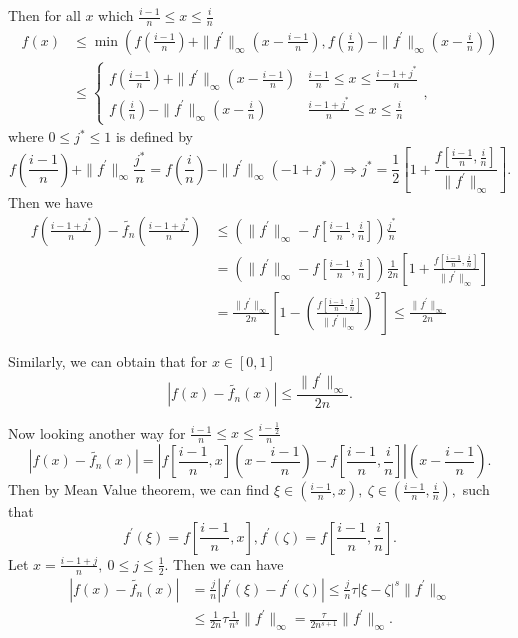   Then for all $x$ which $\frac{i-1}{n} \leq x \leq \frac{i}{n}$
  \begin{align*}
  f(x) & \leq \min\left(f\left(\frac{i-1}{n}\right)+\|f^{'}\|_{\infty}\left(x-\frac{i-1}{n}\right),f\left(\frac{i}{n}\right)-\|f^{'}\|_{\infty}\left(x-\frac{i}{n}\right)\right)\\
  & \leq \left\{\begin{matrix}
  f\left(\frac{i-1}{n}\right)+\|f^{'}\|_{\infty}\left(x-\frac{i-1}{n}\right) & \frac{i-1}{n} \leq x \leq \frac{i-1+j^{*}}{n} \\
  f\left(\frac{i}{n}\right)-\|f^{'}\|_{\infty}\left(x-\frac{i}{n}\right) & \frac{i-1+j^{*}}{n} \leq x \leq \frac{i}{n}
  \end{matrix},\right.
  \end{align*}
where $0 \leq j^{*} \leq 1$ is defined by
$$f\left(\frac{i-1}{n}\right)+\|f^{'}\|_{\infty}\frac{j^{*}}{n}=f\left(\frac{i}{n}\right)-\|f^{'}\|_{\infty}\left(-1+j^{*}\right)
\Rightarrow j^{*}=\frac{1}{2}\left[1+\frac{f\left[\frac{i-1}{n},\frac{i}{n}\right]}{\|f^{'}\|_{\infty}}\right].$$
Then we have
\begin{align*}
f\left(\frac{i-1+j^{*}}{n}\right)-\tilde{f_{n}}\left(\frac{i-1+j^{*}}{n}\right) &
\leq \left(\|f^{'}\|_{\infty}-f\left[\frac{i-1}{n},\frac{i}{n}\right]\right)\frac{j^{*}}{n}\\
& =\left(\|f^{'}\|_{\infty}-f\left[\frac{i-1}{n},\frac{i}{n}\right]\right)\frac{1}{2n}\left[1+\frac{f\left[\frac{i-1}{n},\frac{i}{n}\right]}{\|f^{'}\|_{\infty}}\right]\\
& =\frac{\|f^{'}\|_{\infty}}{2n}\left[1-\left(\frac{f\left[\frac{i-1}{n},\frac{i}{n}\right]}{\|f^{'}\|_{\infty}}\right)^{2}\right]\leq \frac{\|f^{'}\|_{\infty}}{2n}
\end{align*}

Similarly, we can obtain that for $x \in [0,1]$
\begin{equation}|f(x)-\tilde{f_{n}}(x)| \leq \frac{\|f^{'}\|_{\infty}}{2n}.
\end{equation}

Now looking another way for $\frac{i-1}{n} \leq x \leq \frac{i-\frac{1}{2}}{n}$
$$\left|f(x)-\tilde{f_{n}}(x)\right|=\left|f\left[\frac{i-1}{n},x\right]\left(x-\frac{i-1}{n}\right)-f\left[\frac{i-1}{n},\frac{i}{n}\right]\right|\left(x-\frac{i-1}{n}\right).$$
Then by Mean Value theorem, we can find $\xi \in \left(\frac{i-1}{n},x\right), \ \zeta \in \left(\frac{i-1}{n},\frac{i}{n}\right),$ such that
$$f^{'}(\xi)=f\left[\frac{i-1}{n},x\right],f^{'}(\zeta)=f\left[\frac{i-1}{n},\frac{i}{n}\right].$$
Let $x=\frac{i-1+j}{n}, \ 0 \leq j \leq \frac{1}{2}.$ Then we can have
\begin{align*}
\left|f(x)-\tilde{f_{n}}(x)\right|&=\frac{j}{n}|f^{'}(\xi)-f^{'}(\zeta)| \leq \frac{j}{n} \tau |\xi-\zeta|^{s}\|f^{'}\|_{\infty} \\
 & \leq \frac{1}{2n} \tau \frac{1}{n^{s}}\|f^{'}\|_{\infty}=\frac{\tau}{2n^{s+1}}\|f^{'}\|_{\infty}.
\end{align*}

